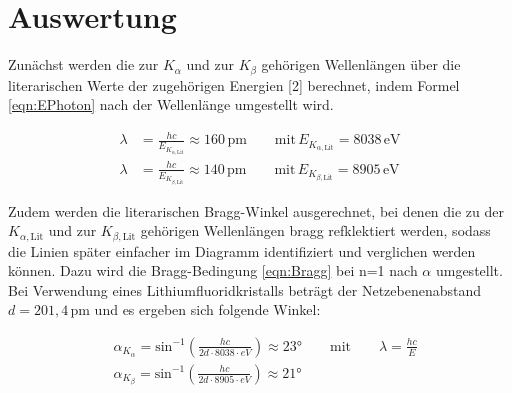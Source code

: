 \documentclass[titlepage = firstcover]{scrartcl}
\begin{document}
    \newpage
    \section{Auswertung}
        Zunächst werden die zur $K_{\alpha}$ und zur $K_{\beta}$ gehörigen Wellenlängen über die literarischen Werte der zugehörigen Energien [2] 
        berechnet, indem Formel \ref{eqn:EPhoton} nach der Wellenlänge umgestellt wird.

        \begin{align}
            \lambda &= \frac{hc}{E_{K_{\alpha, \text{Lit}}}} \approx 160 \,\text{pm} \qquad \text{mit} \, E_{K_{\alpha, \text{Lit}}}=8038 \, \text{eV} \\
            \lambda &= \frac{hc}{E_{K_{\beta, \text{Lit}}}} \approx 140 \,\text{pm} \qquad \text{mit} \, E_{K_{\beta, \text{Lit}}}=8905 \, \text{eV} 
        \end{align}

        \noindent
        Zudem werden die literarischen Bragg-Winkel ausgerechnet, bei denen die zu der $K_{\alpha, \text{Lit}}$ und zur $K_{\beta, \text{Lit}}$ gehörigen Wellenlängen bragg refklektiert werden, 
        sodass die Linien später einfacher im Diagramm identifiziert und verglichen werden können. Dazu wird die Bragg-Bedingung \ref{eqn:Bragg} bei n=1 
        nach $\alpha$ umgestellt. Bei Verwendung eines Lithiumfluoridkristalls beträgt der Netzebenenabstand $d=201,4 \, \text{pm}$ und es ergeben sich
        folgende Winkel:

        \begin{align}
            &\alpha_{K_{\alpha}} = \text{sin}^{-1}\left(\frac{hc}{2d \cdot 8038\cdot eV }\right) \approx 23° \qquad \text{mit} \qquad \lambda = \frac{hc}{E} \\
            &\alpha_{K_{\beta}}  = \text{sin}^{-1}\left(\frac{hc}{2d \cdot 8905\cdot eV }\right) \approx 21°
        \end{align}
\end{document}
